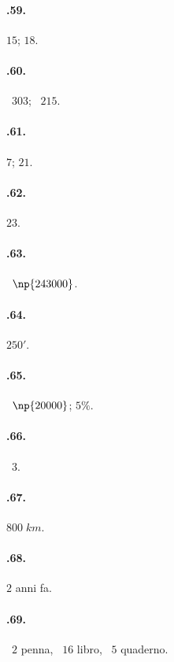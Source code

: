 \begin{multicols}{2}
\paragraph{\thechapter.59.}
$15$; $18$.

\paragraph{\thechapter.60.}
\officialeuro~$303$; \officialeuro~$215$.

\paragraph{\thechapter.61.}
$7$; $21$.

\paragraph{\thechapter.62.}
$23$.

\paragraph{\thechapter.63.}
\officialeuro~$\np{243000}$.

\paragraph{\thechapter.64.}
$250'$.

\paragraph{\thechapter.65.}
\officialeuro~$\np{20000}$; $5\%$.

\paragraph{\thechapter.66.}
\officialeuro~$3$.

\paragraph{\thechapter.67.}
$800\;\unit{km}$.

\paragraph{\thechapter.68.}
$2$ anni fa.

\paragraph{\thechapter.69.}
\officialeuro~$2$ penna, \officialeuro~$16$ libro, \officialeuro~$5$ quaderno.


\end{multicols}
